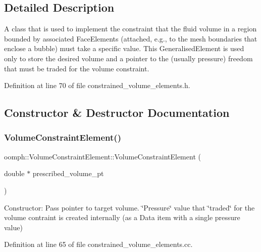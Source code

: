 \subsection{Detailed Description}
A class that is used to implement the constraint that the fluid volume in a region bounded by associated Face\+Elements (attached, e.\+g., to the mesh boundaries that enclose a bubble) must take a specific value. This Generalised\+Element is used only to store the desired volume and a pointer to the (usually pressure) freedom that must be traded for the volume constraint. 

Definition at line 70 of file constrained\+\_\+volume\+\_\+elements.\+h.



\subsection{Constructor \& Destructor Documentation}
\mbox{\label{classoomph_1_1VolumeConstraintElement_a641eea5633b1ddd2d9f79e5731947660}} 
\subsubsection{\texorpdfstring{Volume\+Constraint\+Element()}{VolumeConstraintElement()}\hspace{0.1cm}{\footnotesize\ttfamily [1/2]}}
{\footnotesize\ttfamily oomph\+::\+Volume\+Constraint\+Element\+::\+Volume\+Constraint\+Element (\begin{DoxyParamCaption}\item[{double $\ast$}]{prescribed\+\_\+volume\+\_\+pt }\end{DoxyParamCaption})}



Constructor\+: Pass pointer to target volume. \char`\"{}\+Pressure\char`\"{} value that \char`\"{}traded\char`\"{} for the volume contraint is created internally (as a Data item with a single pressure value) 



Definition at line 65 of file constrained\+\_\+volume\+\_\+elements.\+cc.



